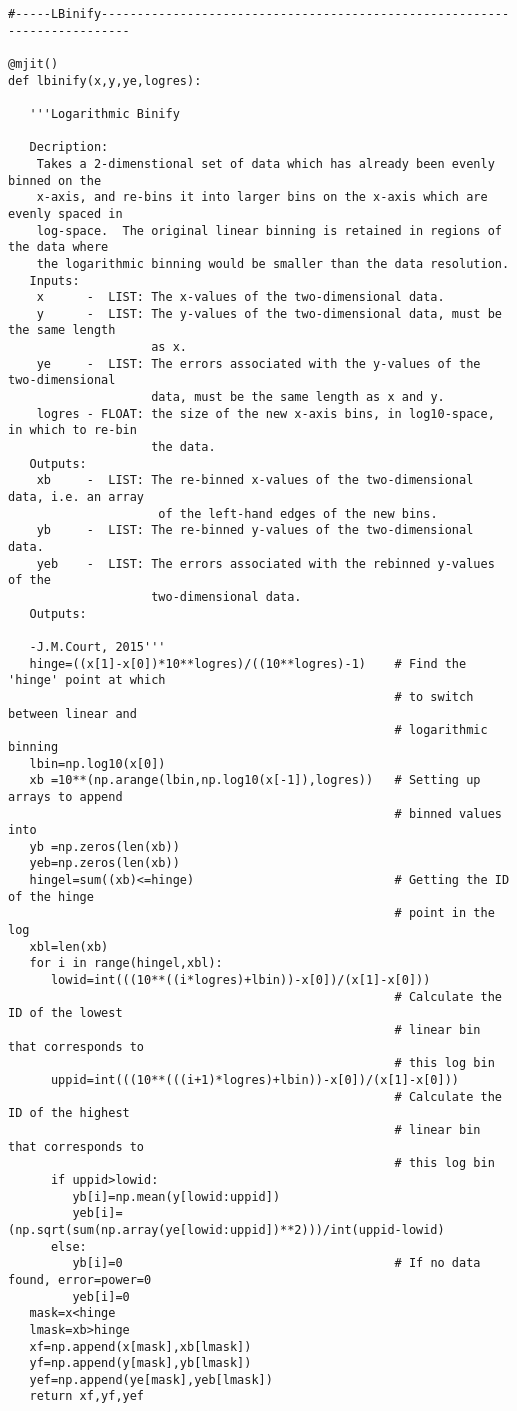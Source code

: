 \begin{verbatim}
#-----LBinify--------------------------------------------------------------------------

@mjit()
def lbinify(x,y,ye,logres):

   '''Logarithmic Binify

   Decription:
    Takes a 2-dimenstional set of data which has already been evenly binned on the
    x-axis, and re-bins it into larger bins on the x-axis which are evenly spaced in
    log-space.  The original linear binning is retained in regions of the data where
    the logarithmic binning would be smaller than the data resolution.
   Inputs:
    x      -  LIST: The x-values of the two-dimensional data.
    y      -  LIST: The y-values of the two-dimensional data, must be the same length
                    as x.
    ye     -  LIST: The errors associated with the y-values of the two-dimensional
                    data, must be the same length as x and y.
    logres - FLOAT: the size of the new x-axis bins, in log10-space, in which to re-bin
                    the data.
   Outputs:
    xb     -  LIST: The re-binned x-values of the two-dimensional data, i.e. an array
                     of the left-hand edges of the new bins.
    yb     -  LIST: The re-binned y-values of the two-dimensional data.
    yeb    -  LIST: The errors associated with the rebinned y-values of the
                    two-dimensional data.
   Outputs:

   -J.M.Court, 2015'''
   hinge=((x[1]-x[0])*10**logres)/((10**logres)-1)    # Find the 'hinge' point at which
                                                      # to switch between linear and 
                                                      # logarithmic binning
   lbin=np.log10(x[0])
   xb =10**(np.arange(lbin,np.log10(x[-1]),logres))   # Setting up arrays to append
                                                      # binned values into
   yb =np.zeros(len(xb))
   yeb=np.zeros(len(xb))
   hingel=sum((xb)<=hinge)                            # Getting the ID of the hinge
                                                      # point in the log
   xbl=len(xb)
   for i in range(hingel,xbl):
      lowid=int(((10**((i*logres)+lbin))-x[0])/(x[1]-x[0]))
                                                      # Calculate the ID of the lowest
                                                      # linear bin that corresponds to
                                                      # this log bin
      uppid=int(((10**(((i+1)*logres)+lbin))-x[0])/(x[1]-x[0]))
                                                      # Calculate the ID of the highest
                                                      # linear bin that corresponds to
                                                      # this log bin
      if uppid>lowid:
         yb[i]=np.mean(y[lowid:uppid])
         yeb[i]=(np.sqrt(sum(np.array(ye[lowid:uppid])**2)))/int(uppid-lowid)
      else:
         yb[i]=0                                      # If no data found, error=power=0
         yeb[i]=0
   mask=x<hinge
   lmask=xb>hinge
   xf=np.append(x[mask],xb[lmask])
   yf=np.append(y[mask],yb[lmask])
   yef=np.append(ye[mask],yeb[lmask])
   return xf,yf,yef


\end{verbatim}
